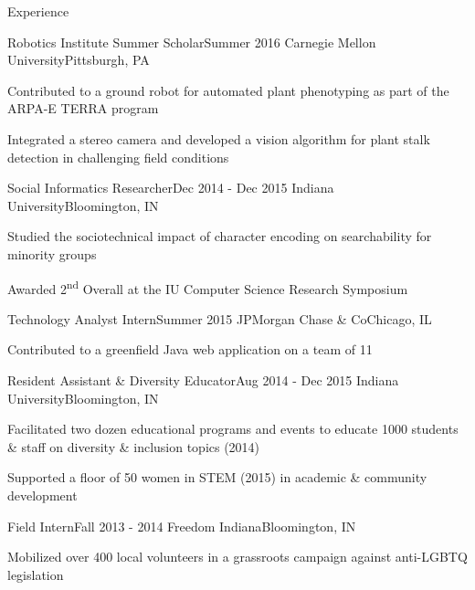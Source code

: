 \documentclass{resume} %
\begin{document}
\begin{rSection}{Experience}

	\begin{rSubsection}{Robotics Institute Summer Scholar}{Summer 2016}
	{Carnegie Mellon University}{Pittsburgh, PA}
	\item Contributed to a ground robot for automated plant phenotyping as part of the ARPA-E TERRA program
	\item Integrated a stereo camera and developed a vision algorithm for plant stalk detection in challenging field conditions
	\end{rSubsection}


	\begin{rSubsection}{Social Informatics Researcher}{Dec 2014 - Dec 2015}
	{Indiana University}{Bloomington, IN }
	\item Studied the sociotechnical impact of character encoding on searchability for minority groups
	\item Awarded 2\textsuperscript{nd} Overall at the IU Computer Science Research Symposium
	\end{rSubsection}

	\begin{rSubsection}{Technology Analyst Intern}{Summer 2015}
	{JPMorgan Chase \& Co}{Chicago, IL}
	\item Contributed to a greenfield Java web application on a team of 11
	\end{rSubsection}

	\begin{rSubsection}{Resident Assistant \& Diversity Educator}{Aug 2014 - Dec 2015}
	{Indiana University}{Bloomington, IN }
	\item Facilitated two dozen educational programs and events to educate 1000 students \& staff on diversity \& inclusion topics (2014)
	\item Supported a floor of 50 women in STEM (2015) in academic \& community development 
	\end{rSubsection}

	\begin{rSubsection}{Field Intern}{Fall 2013 - 2014}
	{Freedom Indiana}{Bloomington, IN}
	\item Mobilized over 400 local volunteers in a grassroots campaign against anti-LGBTQ legislation
	\end{rSubsection}

\end{rSection}	
	
\end{document}
